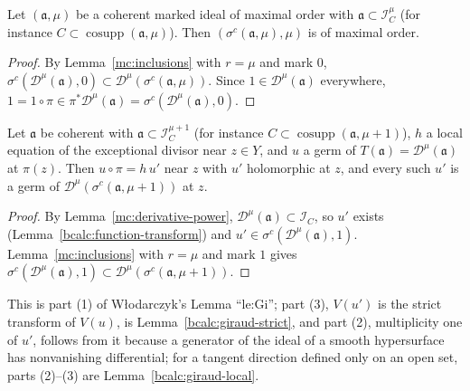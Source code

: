 \begin{lemma}
\label{mc:maximal-order-transform}
\leanok
Let \((\mathfrak a,\mu)\) be a coherent marked ideal of maximal order with \(\mathfrak a\subset\mathcal I_C^\mu\) (for instance
\(C\subset\operatorname{cosupp}(\mathfrak a,\mu)\)). Then \((\sigma^c(\mathfrak a,\mu),\mu)\) is of maximal order.
\end{lemma}
\begin{proof}
\leanok
By Lemma~\ref{mc:inclusions} with \(r=\mu\) and mark \(0\), \(\sigma^c(\mathcal D^\mu(\mathfrak a),0)\subset\mathcal D^\mu(\sigma^c(\mathfrak a,\mu))\). Since
\(1\in\mathcal D^\mu(\mathfrak a)\) everywhere, \(1=1\circ\pi\in\pi^*\mathcal D^\mu(\mathfrak a)=\sigma^c(\mathcal D^\mu(\mathfrak a),0)\).
\end{proof}
\begin{lemma}
\label{mc:giraud-transform}
\leanok
Let \(\mathfrak a\) be coherent with \(\mathfrak a\subset\mathcal I_C^{\mu+1}\) (for instance \(C\subset\operatorname{cosupp}(\mathfrak a,\mu+1)\)), \(h\) a
local equation of the exceptional divisor near \(z\in Y\), and \(u\) a germ of \(T(\mathfrak a)=\mathcal D^\mu(\mathfrak a)\) at \(\pi(z)\). Then
\(u\circ\pi=h\,u'\) near \(z\) with \(u'\) holomorphic at \(z\), and every such \(u'\) is a germ of \(\mathcal D^\mu(\sigma^c(\mathfrak a,\mu+1))\) at \(z\).
\end{lemma}
\begin{proof}
\leanok
By Lemma~\ref{mc:derivative-power}, \(\mathcal D^\mu(\mathfrak a)\subset\mathcal I_C\), so \(u'\) exists (Lemma~\ref{bcalc:function-transform}) and
\(u'\in\sigma^c(\mathcal D^\mu(\mathfrak a),1)\). Lemma~\ref{mc:inclusions} with \(r=\mu\) and mark \(1\) gives
\(\sigma^c(\mathcal D^\mu(\mathfrak a),1)\subset\mathcal D^\mu(\sigma^c(\mathfrak a,\mu+1))\).
\end{proof}
This is part (1) of Włodarczyk's Lemma ``le:Gi''; part (3), \(V(u')\) is the strict transform of \(V(u)\), is
Lemma~\ref{bcalc:giraud-strict}, and part (2), multiplicity one of \(u'\), follows from it because a generator of the ideal of a
smooth hypersurface has nonvanishing differential; for a tangent direction defined only on an open set, parts (2)--(3) are
Lemma~\ref{bcalc:giraud-local}.

